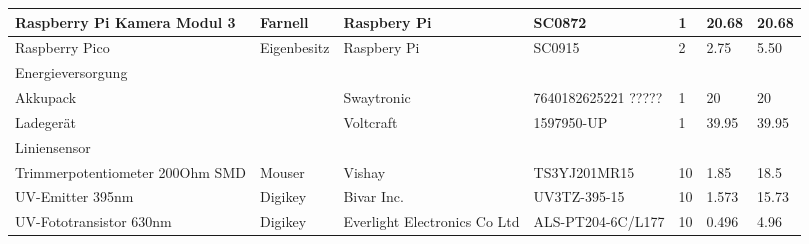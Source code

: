 \documentclass[main.tex]{subfiles} %
\begin{document}
\begin{table}[htbp]
{\begin{tabular}{|p{3cm}|p{2.5cm}|p{2.5cm}|p{3cm}|p{1cm}|p{1.5cm}|p{1cm}|}
            Raspberry Pi Kamera Modul 3             & Farnell            & Raspbery Pi                  & SC0872                  & 1               & 20.68                     & 20.68                       \\ \hline
            Raspberry Pico                          & Eigenbesitz        & Raspbery Pi                  & SC0915                  & 2               & 2.75                      & 5.50                        \\ \hline
            \rowcolor{lightgray} Energieversorgung  &                    &                              &                         &                 &                           &                                 \\ \hline
            Akkupack                                &                    & Swaytronic                   & 7640182625221 ?????     & 1               & 20                        & 20                        \\ \hline
            Ladegerät                               &                    & Voltcraft                    & 1597950-UP              & 1               & 39.95                     & 39.95                           \\ \hline
            \rowcolor{lightgray} Liniensensor       &                    &                              &                         &                 &                           &                             \\ \hline
            Trimmerpotentiometer 200Ohm SMD         & Mouser             & Vishay                       & TS3YJ201MR15            & 10              & 1.85                      & 18.5                        \\ \hline
            UV-Emitter 395nm                        & Digikey            & Bivar Inc.                   & UV3TZ-395-15            & 10              & 1.573                     & 15.73                       \\ \hline
            UV-Fototransistor 630nm                 & Digikey            & Everlight Electronics Co Ltd & ALS-PT204-6C/L177       & 10              & 0.496                     & 4.96                        \\ \hline

\end{tabular}}
\end{table}
\end{document}
